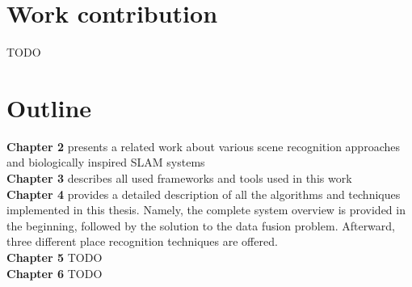 \section{Work contribution}

TODO

\section{Outline}

\textbf{Chapter 2} presents a related work about various scene recognition approaches and biologically inspired SLAM systems \\
\textbf{Chapter 3} describes all used frameworks and tools used in this work\\
\textbf{Chapter 4} provides a detailed description of all the algorithms and techniques implemented in this thesis. Namely, the complete system overview is provided in the beginning, followed by the solution to the data fusion problem. Afterward, three different place recognition techniques are offered.\\
\textbf{Chapter 5} TODO\\
\textbf{Chapter 6} TODO\\
